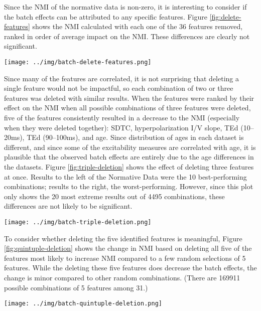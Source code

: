 \documentclass[12pt]{article}
\begin{document}
Since the NMI of the normative data is non-zero, it is interesting to consider if the batch effects can be attributed to any specific features. Figure \ref{fig:delete-features} shows the NMI calculated with each one of the 36 features removed, ranked in order of average impact on the NMI. These differences are clearly not significant.

\begin{figure*}
  \centering
       \texttt{[image: ../img/batch-delete-features.png]}
  \label{fig:delete-features}
\end{figure*}

Since many of the features are correlated, it is not surprising that deleting a single feature would not be impactful, so each combination of two or three features was deleted with similar results. When the features were ranked by their effect on the NMI when all possible combinations of three features were deleted, five of the features consistently resulted in a decrease to the NMI (especially when they were deleted together): SDTC, hyperpolarization I/V slope, TEd (10–20ms), TEd (90–100ms), and age. Since distribution of ages in each dataset is different, and since some of the excitability measures are correlated with age, %
it is plausible that the observed batch effects are entirely due to the age differences in the datasets. Figure \ref{fig:triple-deletion} shows the effect of deleting three features at once. Results to the left of the Normative Data were the 10 best-performing combinations; results to the right, the worst-performing. However, since this plot only shows the 20 most extreme results out of 4495 combinations, these differences are not likely to be significant.

\begin{figure*}
  \centering
       \texttt{[image: ../img/batch-triple-deletion.png]}
  \label{fig:triple-deletion}
\end{figure*}

To consider whether deleting the five identified features is meaningful, Figure \ref{fig:quintuple-deletion} shows the change in NMI based on deleting all five of the features most likely to increase NMI compared to a few random selections of 5 features. While the deleting these five features does decrease the batch effects, the change is minor compared to other random combinations. (There are 169911 possible combinations of 5 features among 31.)

\begin{figure*}
  \centering
       \texttt{[image: ../img/batch-quintuple-deletion.png]}
  \label{fig:quintuple-deletion}
\end{figure*}
\end{document}
